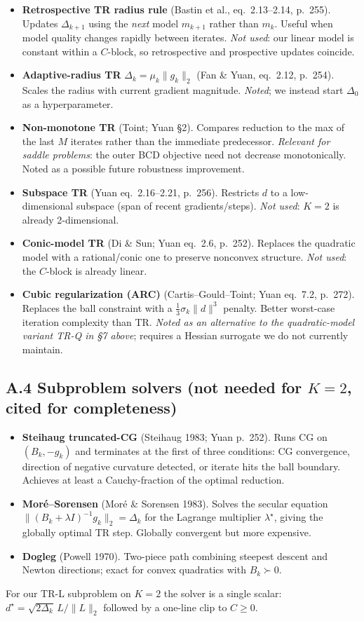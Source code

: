 \documentclass[11pt,a4paper]{article}
\begin{document}
\begin{itemize}[leftmargin=*,itemsep=2pt]
  \item \textbf{Retrospective TR radius rule} (Bastin et al., eq.\ 2.13--2.14, p.\ 255). Updates $\Delta_{k+1}$ using the \emph{next} model $m_{k+1}$ rather than $m_k$. Useful when model quality changes rapidly between iterates. \emph{Not used}: our linear model is constant within a $C$-block, so retrospective and prospective updates coincide.
  \item \textbf{Adaptive-radius TR} $\Delta_k = \mu_k\|g_k\|_2$ (Fan \& Yuan, eq.\ 2.12, p.\ 254). Scales the radius with current gradient magnitude. \emph{Noted}; we instead start $\Delta_0$ as a hyperparameter.
  \item \textbf{Non-monotone TR} (Toint; Yuan \S 2). Compares reduction to the max of the last $M$ iterates rather than the immediate predecessor. \emph{Relevant for saddle problems}: the outer BCD objective need not decrease monotonically. Noted as a possible future robustness improvement.
  \item \textbf{Subspace TR} (Yuan eq.\ 2.16--2.21, p.\ 256). Restricts $d$ to a low-dimensional subspace (span of recent gradients/steps). \emph{Not used}: $K = 2$ is already 2-dimensional.
  \item \textbf{Conic-model TR} (Di \& Sun; Yuan eq.\ 2.6, p.\ 252). Replaces the quadratic model with a rational/conic one to preserve nonconvex structure. \emph{Not used}: the $C$-block is already linear.
  \item \textbf{Cubic regularization (ARC)} (Cartis--Gould--Toint; Yuan eq.\ 7.2, p.\ 272). Replaces the ball constraint with a $\tfrac13 \sigma_k\|d\|^3$ penalty. Better worst-case iteration complexity than TR. \emph{Noted as an alternative to the quadratic-model variant TR-Q in \S 7 above}; requires a Hessian surrogate we do not currently maintain.
\end{itemize}

\subsection{A.4\; Subproblem solvers (not needed for $K = 2$, cited for completeness)}

\begin{itemize}[leftmargin=*,itemsep=2pt]
  \item \textbf{Steihaug truncated-CG} (Steihaug 1983; Yuan p.\ 252). Runs CG on $(B_k,-g_k)$ and terminates at the first of three conditions: CG convergence, direction of negative curvature detected, or iterate hits the ball boundary. Achieves at least a Cauchy-fraction of the optimal reduction.
  \item \textbf{Mor\'e--Sorensen} (Mor\'e \& Sorensen 1983). Solves the secular equation $\|(B_k + \lambda I)^{-1}g_k\|_2 = \Delta_k$ for the Lagrange multiplier $\lambda^\star$, giving the globally optimal TR step. Globally convergent but more expensive.
  \item \textbf{Dogleg} (Powell 1970). Two-piece path combining steepest descent and Newton directions; exact for convex quadratics with $B_k \succ 0$.
\end{itemize}

For our TR-L subproblem on $K = 2$ the solver is a single scalar: $d^\star = \sqrt{2\Delta_k}\,L/\|L\|_2$ followed by a one-line clip to $C \ge 0$.
\end{document}
